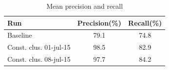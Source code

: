 \documentclass{acm_proc_article-me}
\begin{document}
\begin{table}[ht]
  \centering
  \begin{tabular}{|l|c|c|}
    \hline
	Run 						& Precision(\%)	& Recall(\%)		\\
	\hline
	\hline
	Baseline					& 79.1			& 74.8			\\
	\hline
	Const. clus. 01-jul-15 	& 98.5			& 82.9			\\
	Const. clus. 08-jul-15 	& 97.7			& 84.2			\\
  	\hline
  \end{tabular}
  \caption{Mean precision and recall}
  \label{tab:precions_and_recall}
\end{table}

%
%
%
%
%
%
%
\end{document}
